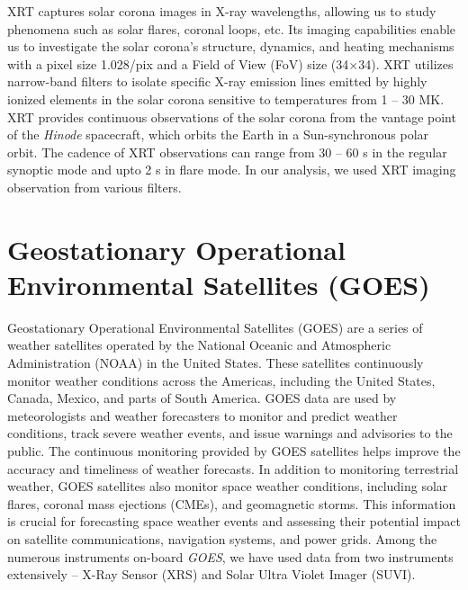 XRT captures solar corona images in X-ray wavelengths, allowing us to study phenomena such as solar flares, coronal loops, etc. Its imaging capabilities enable us to investigate the solar corona's structure, dynamics, and heating mechanisms with a pixel size 1.028{\arcsec}/pix and a Field of View (FoV) size (34{\arcmin}$\times$34{\arcmin}). XRT utilizes narrow-band filters to isolate specific X-ray emission lines emitted by highly ionized elements in the solar corona sensitive to temperatures from 1 {--} 30 MK. XRT provides continuous observations of the solar corona from the vantage point of the {\it Hinode} spacecraft, which orbits the Earth in a Sun-synchronous polar orbit. The cadence of XRT observations can range from 30 {--} 60 s in the regular synoptic mode and upto 2 s in flare mode. In our analysis, we used XRT imaging observation from various filters. %

\section{Geostationary Operational Environmental Satellites (GOES)}

Geostationary Operational Environmental Satellites (GOES) are a series of weather satellites operated by the National Oceanic and Atmospheric Administration (NOAA) in the United States. These satellites continuously monitor weather conditions across the Americas, including the United States, Canada, Mexico, and parts of South America. GOES data are used by meteorologists and weather forecasters to monitor and predict weather conditions, track severe weather events, and issue warnings and advisories to the public. The continuous monitoring provided by GOES satellites helps improve the accuracy and timeliness of weather forecasts. In addition to monitoring terrestrial weather, GOES satellites also monitor space weather conditions, including solar flares, coronal mass ejections (CMEs), and geomagnetic storms. This information is crucial for forecasting space weather events and assessing their potential impact on satellite communications, navigation systems, and power grids. Among the numerous instruments on-board {\it GOES}, we have used data from two instruments extensively {--} X-Ray Sensor (XRS) and Solar Ultra Violet Imager (SUVI).


